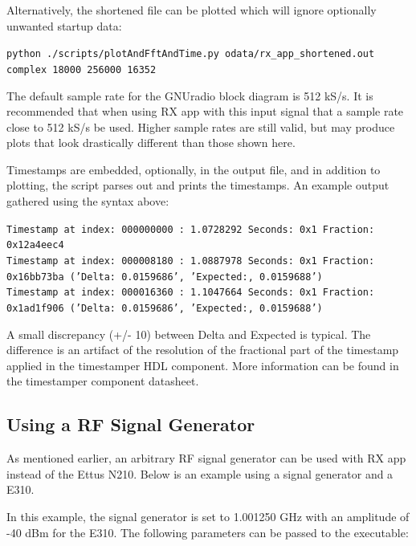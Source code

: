 \noindent Alternatively, the shortened file can be plotted which will ignore optionally unwanted startup data:\par\medskip
\noindent\texttt{python ./scripts/plotAndFftAndTime.py odata/rx\_app\_shortened.out complex 18000 256000 16352}\par\medskip
\noindent The default sample rate for the GNUradio block diagram is 512 kS/s. It is recommended that when using RX app with this input signal that a sample rate close to 512 kS/s be used. Higher sample rates are still valid, but may produce plots that look drastically different than those shown here.\par\medskip
\newpage
\noindent Timestamps are embedded, optionally, in the output file, and in addition to plotting, the script parses out and prints the timestamps. An example output gathered using the syntax above:\par\medskip
\scriptsize\noindent\texttt{Timestamp at index: 000000000 :  1.0728292 Seconds: 0x1 Fraction: 0x12a4eec4  \\
Timestamp at index: 000008180 :  1.0887978 Seconds: 0x1 Fraction: 0x16bb73ba ('Delta: 0.0159686', 'Expected:, 0.0159688')\\
Timestamp at index: 000016360 :  1.1047664 Seconds: 0x1 Fraction: 0x1ad1f906 ('Delta: 0.0159686', 'Expected:, 0.0159688')}\par\medskip
\noindent\small A small discrepancy (+/- 10) between Delta and Expected is typical. The difference is an artifact of the resolution of the fractional part of the timestamp applied in the timestamper HDL component. More information can be found in the timestamper component datasheet.\par\medskip
\par\medskip

\subsection{Using a RF Signal Generator}
\noindent As mentioned earlier, an arbitrary RF signal generator can be used with RX app instead of the Ettus N210. Below is an example using a signal generator and a E310.\par\medskip
\noindent In this example, the signal generator is set to 1.001250 GHz with an amplitude of -40 dBm for the E310. The following parameters can be passed to the executable:\par\medskip


